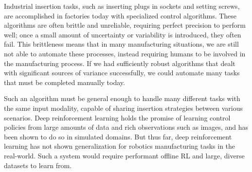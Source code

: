 Industrial insertion tasks, such as inserting plugs in sockets and setting screws, are accomplished in factories today with specialized control algorithms.
These algorithms are often brittle and unreliable, requiring perfect precision to perform well; once a small amount of uncertainty or variability is introduced, they often fail.
This brittleness means that in many manufacturing situations, we are still not able to automate these processes, instead requiring humans to be involved in the manufacturing process.
If we had sufficiently robust algorithms that dealt with significant sources of variance successfully, we could automate many tasks that must be completed manually today.


Such an algorithm must be general enough to handle many different tasks with the same input modality, capable of sharing insertion strategies between various scenarios. 
Deep reinforcement learning holds the promise of learning control policies from large amounts of data and rich observations such as images, and has been shown to do so in simulated domains.
But thus far, deep reinforcement learning has not shown generalization for robotics manufacturing tasks in the real-world.
Such a system would require performant offline RL and large, diverse datasets to learn from.

